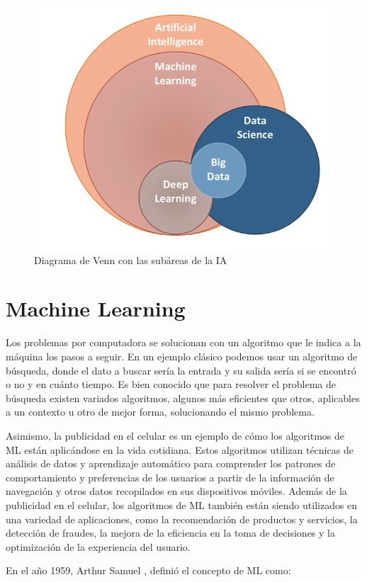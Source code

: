 \begin{figure}[H]
	\centering
	\includegraphics[scale=0.51]{img/Marco Teorico/Expertiz.png} 
	\caption{Diagrama de Venn con las subáreas de la IA}
\end{figure}


\doublespacing
\section{Machine Learning}
Los problemas por computadora se solucionan con un algoritmo que le indica a la máquina los pasos a seguir. En un ejemplo clásico podemos usar un algoritmo de búsqueda, donde el dato a buscar sería la entrada y su salida sería si se encontró o no y en cuánto tiempo. Es bien conocido que para resolver el problema de búsqueda existen variados algoritmos, algunos más eficientes que otros, aplicables a un contexto u otro de mejor forma, solucionando el mismo problema.\\
\par Asimismo, la publicidad en el celular es un ejemplo de cómo los algoritmos de ML están aplicándose en la vida cotidiana. Estos algoritmos utilizan técnicas de análisis de datos y aprendizaje automático para comprender los patrones de comportamiento y preferencias de los usuarios a partir de la información de navegación y otros datos recopilados en sus dispositivos móviles. Además de la publicidad en el celular, los algoritmos de ML también están siendo utilizados en una variedad de aplicaciones, como la recomendación de productos y servicios, la detección de fraudes, la mejora de la eficiencia en la toma de decisiones y la optimización de la experiencia del usuario.\\
\par En el año 1959, Arthur Samuel \cite{samuel1959machine}, definió el concepto de ML como:

